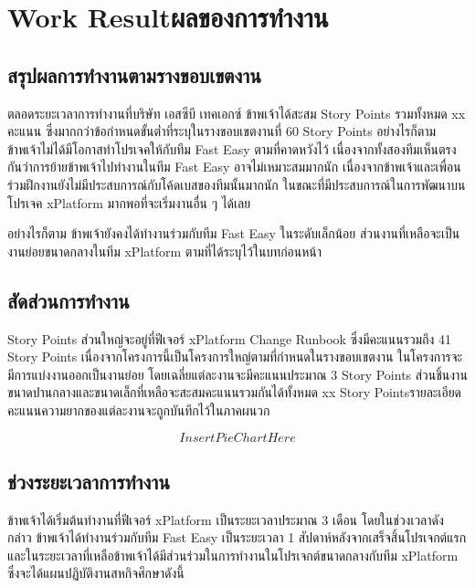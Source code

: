 \chapter{\ifenglish Work Result\else ผลของการทำงาน\fi}

\section{สรุปผลการทำงานตามรางขอบเขตงาน}
ตลอดระยะเวลาการทำงานที่บริษัท เอสซีบี เทคเอกซ์ ข้าพเจ้าได้สะสม Story Points รวมทั้งหมด xx คะแนน ซึ่งมากกว่าข้อกำหนดขั้นต่ำที่ระบุในรางขอบเขตงานที่ 60 Story Points อย่างไรก็ตาม ข้าพเจ้าไม่ได้มีโอกาสทำโปรเจคให้กับทีม Fast Easy ตามที่คาดหวังไว้ เนื่องจากทั้งสองทีมเห็นตรงกันว่าการย้ายข้าพเจ้าไปทำงานในทีม Fast Easy อาจไม่เหมาะสมมากนัก เนื่องจากข้าพเจ้าและเพื่อนร่วมฝึกงานยังไม่มีประสบการณ์กับโค้ดเบสของทีมนั้นมากนัก ในขณะที่มีประสบการณ์ในการพัฒนาบนโปรเจค xPlatform มากพอที่จะเริ่มงานอื่น ๆ ได้เลย

อย่างไรก็ตาม ข้าพเจ้ายังคงได้ทำงานร่วมกับทีม Fast Easy ในระดับเล็กน้อย ส่วนงานที่เหลือจะเป็นงานย่อยขนาดกลางในทีม xPlatform ตามที่ได้ระบุไว้ในบทก่อนหน้า

\section{สัดส่วนการทำงาน}
Story Points ส่วนใหญ่จะอยู่ที่ฟีเจอร์ xPlatform Change Runbook ซึ่งมีคะแนนรวมถึง 41 Story Points เนื่องจากโครงการนี้เป็นโครงการใหญ่ตามที่กำหนดในรางขอบเขตงาน ในโครงการจะมีการแบ่งงานออกเป็นงานย่อย โดยเฉลี่ยแต่ละงานจะมีคะแนนประมาณ 3 Story Points ส่วนชิ้นงานขนาดปานกลางและขนาดเล็กที่เหลือจะสะสมคะแนนรวมกันได้ทั้งหมด xx Story Points\enskip รายละเอียดคะแนนความยากของแต่ละงานจะถูกบันทึกไว้ในภาคผนวก

\[Insert Pie Chart Here\]

\section{ช่วงระยะเวลาการทำงาน}ข้าพเจ้าได้เริ่มต้นทำงานที่ฟีเจอร์ xPlatform เป็นระยะเวลาประมาณ 3 เดือน โดยในช่วงเวลาดังกล่าว ข้าพเจ้าได้ทำงานร่วมกับทีม Fast Easy เป็นระยะเวลา 1 สัปดาห์หลังจากเสร็จสิ้นโปรเจกต์แรก และในระยะเวลาที่เหลือข้าพเจ้าได้มีส่วนร่วมในการทำงานในโปรเจกต์ขนาดกลางกับทีม xPlatform ซึ่งจะได้แผนปฏิบัติงานสหกิจศึกษาดังนี้

\newcommand{\gantttitlevertical}[1]{\gantttitle{\rotatebox{90}{#1}}{1}}
\newcommand{\gantttitles}[2]{%
  \foreach \x in {#1} {%
    \gantttitle{\x}{#2}%
  }%
}

